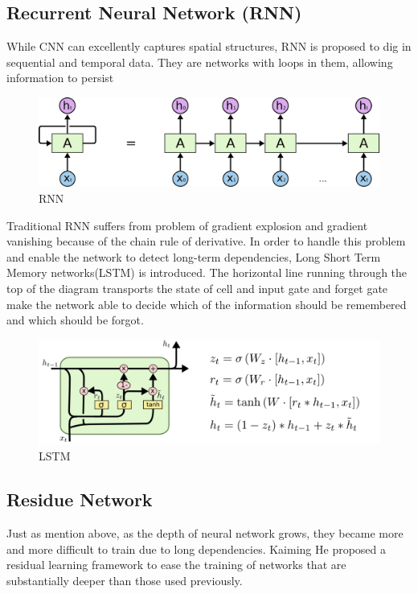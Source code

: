 \documentclass[10pt,twocolumn,letterpaper]{article}
\begin{document}
\subsection{Recurrent Neural Network (RNN)}
	While CNN can excellently captures spatial structures, RNN is proposed to dig in sequential and temporal data. They are networks with loops in them, allowing information to persist\cite{colah}
	
	\begin{figure}[h]
		\begin{center}
			\includegraphics[width=0.8\linewidth]{images/rnn}
			\caption{RNN}
		\end{center}
	\end{figure}

Traditional RNN suffers from problem of gradient explosion and gradient vanishing because of the chain rule of derivative\cite{goodfellow_bengio_courville_2017}. In order to handle this problem and enable the network to detect long-term dependencies, Long Short Term Memory networks(LSTM) is introduced\cite{lstm}. The horizontal line running through the top of the diagram transports the state of cell and input gate and forget gate make the network able to decide which of the information should be remembered and which should be forgot.

	\begin{figure}[h]
		\begin{center}
			\includegraphics[width=\linewidth]{images/lstm}
			\caption{LSTM}
		\end{center}
	\end{figure}
	
\subsection{Residue Network}
	Just as mention above, as the depth of neural network grows, they became more and more difficult to train due to long dependencies. Kaiming He proposed a residual learning framework to ease the training of networks that are substantially deeper than those used previously\cite{he_zhang_ren_sun_2016}.
	
\end{document}
